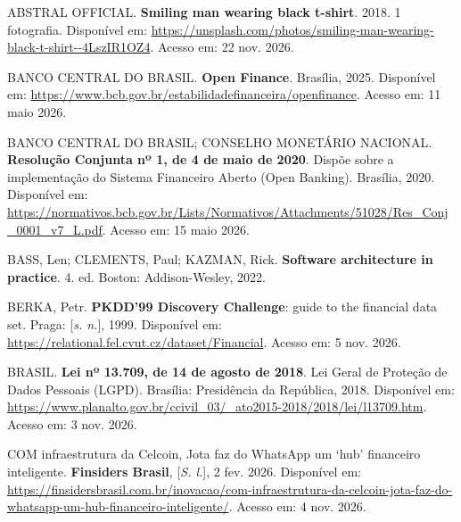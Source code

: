 \newpage
{}

\begingroup
\setlength{\parindent}{0pt}
\raggedright

ABSTRAL OFFICIAL. \textbf{Smiling man wearing black t-shirt}. 2018. 1 fotografia. Disponível em: \url{https://unsplash.com/photos/smiling-man-wearing-black-t-shirt--4LszIR1OZ4}. Acesso em: 22 nov. 2026.

\vspace{\baselineskip}

BANCO CENTRAL DO BRASIL. \textbf{Open Finance}. Brasília, 2025. Disponível em: \url{https://www.bcb.gov.br/estabilidadefinanceira/openfinance}. Acesso em: 11 maio 2026.

\vspace{\baselineskip}

BANCO CENTRAL DO BRASIL; CONSELHO MONETÁRIO NACIONAL. \textbf{Resolução Conjunta nº 1, de 4 de maio de 2020}. Dispõe sobre a implementação do Sistema Financeiro Aberto (Open Banking). Brasília, 2020. Disponível em: \url{https://normativos.bcb.gov.br/Lists/Normativos/Attachments/51028/Res_Conj_0001_v7_L.pdf}. Acesso em: 15 maio 2026.

\vspace{\baselineskip}

BASS, Len; CLEMENTS, Paul; KAZMAN, Rick. \textbf{Software architecture in practice}. 4. ed. Boston: Addison-Wesley, 2022.

\vspace{\baselineskip}

BERKA, Petr. \textbf{PKDD'99 Discovery Challenge}: guide to the financial data set. Praga: [\textit{s. n.}], 1999. Disponível em: \url{https://relational.fel.cvut.cz/dataset/Financial}. Acesso em: 5 nov. 2026.

\vspace{\baselineskip}

BRASIL. \textbf{Lei nº 13.709, de 14 de agosto de 2018}. Lei Geral de Proteção de Dados Pessoais (LGPD). Brasília: Presidência da República, 2018. Disponível em: \url{https://www.planalto.gov.br/ccivil_03/_ato2015-2018/2018/lei/l13709.htm}. Acesso em: 3 nov. 2026.

\vspace{\baselineskip}

COM infraestrutura da Celcoin, Jota faz do WhatsApp um `hub' financeiro inteligente. \textbf{Finsiders Brasil}, [\textit{S. l.}], 2 fev. 2026. Disponível em: \url{https://finsidersbrasil.com.br/inovacao/com-infraestrutura-da-celcoin-jota-faz-do-whatsapp-um-hub-financeiro-inteligente/}. Acesso em: 4 nov. 2026.

